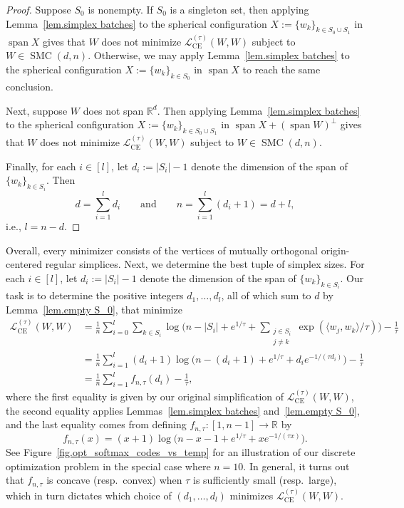 \documentclass{article}
\theoremstyle{plain}
\theoremstyle{definition}
\begin{document}
\begin{proof}
Suppose $S_0$ is nonempty.
If $S_0$ is a singleton set, then applying Lemma~\ref{lem.simplex batches} to the spherical configuration $X:=\{w_k\}_{k\in S_0\cup S_1}$ in $\operatorname{span}X$ gives that $W$ does not minimize $\mathcal{L}_{\operatorname{CE}}^{(\tau)}(W,W)$ subject to $W\in\operatorname{SMC}(d,n)$.
Otherwise, we may apply Lemma~\ref{lem.simplex batches} to the spherical configuration $X:=\{w_k\}_{k\in S_0}$ in $\operatorname{span}X$ to reach the same conclusion.

Next, suppose $W$ does not span $\mathbb{R}^d$.
Then applying Lemma~\ref{lem.simplex batches} to the spherical configuration $X:=\{w_k\}_{k\in S_0\cup S_1}$ in $\operatorname{span}X+(\operatorname{span}W)^\perp$ gives that $W$ does not minimize $\mathcal{L}_{\operatorname{CE}}^{(\tau)}(W,W)$ subject to $W\in\operatorname{SMC}(d,n)$.

Finally, for each $i\in[l]$, let $d_i:=|S_i|-1$ denote the dimension of the span of $\{w_k\}_{k\in S_i}$.
Then
\[
d=\sum_{i=1}^l d_i
\qquad
\text{and}
\qquad
n=\sum_{i=1}^l (d_i+1)
= d+l,
\]
i.e., $l=n-d$.
\end{proof}

Overall, every minimizer consists of the vertices of mutually orthogonal origin-centered regular simplices.
Next, we determine the best tuple of simplex sizes.
For each $i\in[l]$, let $d_i:=|S_i|-1$ denote the dimension of the span of $\{w_k\}_{k\in S_i}$.
Our task is to determine the positive integers $d_1,\ldots,d_l$, all of which sum to $d$ by Lemma~\ref{lem.empty S_0}, that minimize
\begin{align*}
\mathcal{L}_{\operatorname{CE}}^{(\tau)}(W,W)
&=\frac{1}{n}\sum_{i=0}^{l}\sum_{k\in S_i} \log \bigg( n-|S_i|+e^{1/\tau}+\sum_{\substack{j\in S_i\\j\neq k}}\exp(\langle w_j, w_k\rangle/\tau) \bigg)-\frac{1}{\tau}\\
&=\frac{1}{n}\sum_{i=1}^{l}(d_i+1)\log \big( n-(d_i+1)+e^{1/\tau}+d_ie^{-1/(\tau d_i)} \big)-\frac{1}{\tau}\\
&=\frac{1}{n}\sum_{i=1}^{l}f_{n,\tau}(d_i)-\frac{1}{\tau},
\end{align*}
where the first equality is given by our original simplification of $\mathcal{L}_{\operatorname{CE}}^{(\tau)}(W,W)$, the second equality applies Lemmas~\ref{lem.simplex batches} and~\ref{lem.empty S_0}, and the last equality comes from defining $f_{n,\tau}\colon[1,n-1]\to\mathbb{R}$ by 
\[
f_{n,\tau}(x)
=(x+1)\log\big(n-x-1+e^{1/\tau}+xe^{-1/(\tau x)}\big).
\]
See Figure~\ref{fig.opt_softmax_codes_vs_temp} for an illustration of our discrete optimization problem in the special case where $n=10$.
In general, it turns out that $f_{n,\tau}$ is concave (resp.\ convex) when $\tau$ is sufficiently small (resp.\ large), which in turn dictates which choice of $(d_1,\ldots,d_l)$ minimizes $\mathcal{L}_{\operatorname{CE}}^{(\tau)}(W,W)$.
\end{document}

